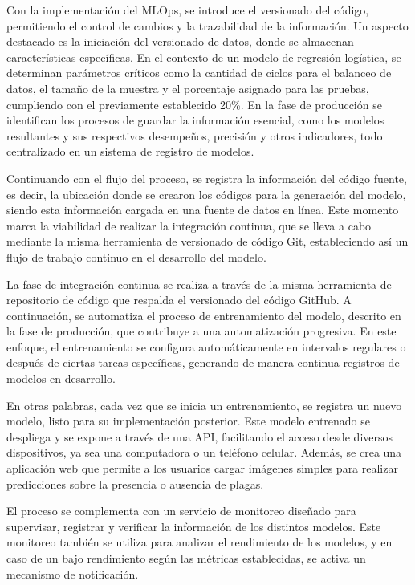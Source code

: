 Con la implementación del MLOps, se introduce el versionado del código, permitiendo el control de cambios y la trazabilidad de la información. Un aspecto destacado es la iniciación del versionado de datos, donde se almacenan características específicas. En el contexto de un modelo de regresión logística, se determinan parámetros críticos como la cantidad de ciclos para el balanceo de datos, el tamaño de la muestra y el porcentaje asignado para las pruebas, cumpliendo con el previamente establecido 20\%. En la fase de producción se identifican los procesos de guardar la información esencial, como los modelos resultantes y sus respectivos desempeños, precisión y otros indicadores, todo centralizado en un sistema de registro de modelos. \newline

Continuando con el flujo del proceso, se registra la información del código fuente, es decir, la ubicación donde se crearon los códigos para la generación del modelo, siendo esta información cargada en una fuente de datos en línea. Este momento marca la viabilidad de realizar la integración continua, que se lleva a cabo mediante la misma herramienta de versionado de código Git, estableciendo así un flujo de trabajo continuo en el desarrollo del modelo. \newline

La fase de integración continua se realiza a través de la misma herramienta de repositorio de código que respalda el versionado del código GitHub. A continuación, se automatiza el proceso de entrenamiento del modelo, descrito en la fase de producción, que contribuye a una automatización progresiva. En este enfoque, el entrenamiento se configura automáticamente en intervalos regulares o después de ciertas tareas específicas, generando de manera continua registros de modelos en desarrollo.

\newpage

En otras palabras, cada vez que se inicia un entrenamiento, se registra un nuevo modelo, listo para su implementación posterior. Este modelo entrenado se despliega y se expone a través de una API, facilitando el acceso desde diversos dispositivos, ya sea una computadora o un teléfono celular. Además, se crea una aplicación web que permite a los usuarios cargar imágenes simples para realizar predicciones sobre la presencia o ausencia de plagas. \newline

El proceso se complementa con un servicio de monitoreo diseñado para supervisar, registrar y verificar la información de los distintos modelos. Este monitoreo también se utiliza para analizar el rendimiento de los modelos, y en caso de un bajo rendimiento según las métricas establecidas, se activa un mecanismo de notificación. \newline

